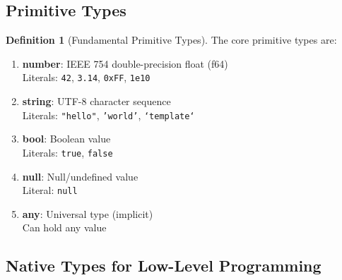 \documentclass[12pt,a4paper]{article}
\theoremstyle{definition}
\newtheorem{definition}{Definition}[section]
\begin{document}
\subsection{Primitive Types}

\begin{definition}[Fundamental Primitive Types]
The core primitive types are:

\begin{enumerate}[leftmargin=*]
    \item \textbf{number}: IEEE 754 double-precision float (f64) \\
    Literals: \texttt{42}, \texttt{3.14}, \texttt{0xFF}, \texttt{1e10}
    
    \item \textbf{string}: UTF-8 character sequence \\
    Literals: \texttt{"hello"}, \texttt{'world'}, \texttt{`template`}
    
    \item \textbf{bool}: Boolean value \\
    Literals: \texttt{true}, \texttt{false}
    
    \item \textbf{null}: Null/undefined value \\
    Literal: \texttt{null}
    
    \item \textbf{any}: Universal type (implicit) \\
    Can hold any value
\end{enumerate}
\end{definition}

\subsection{Native Types for Low-Level Programming}
\end{document}
